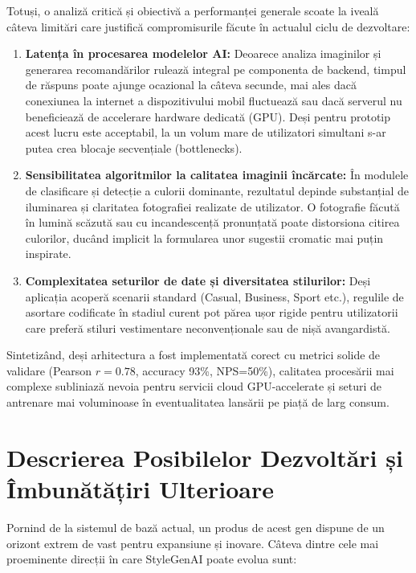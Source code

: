 Totuși, o analiză critică și obiectivă a performanței generale scoate la iveală câteva limitări care justifică compromisurile făcute în actualul ciclu de dezvoltare:

\begin{enumerate}
    \item \textbf{Latența în procesarea modelelor AI:} Deoarece analiza imaginilor și generarea recomandărilor rulează integral pe componenta de backend, timpul de răspuns poate ajunge ocazional la câteva secunde, mai ales dacă conexiunea la internet a dispozitivului mobil fluctuează sau dacă serverul nu beneficiează de accelerare hardware dedicată (GPU). Deși pentru prototip acest lucru este acceptabil, la un volum mare de utilizatori simultani s-ar putea crea blocaje secvențiale (bottlenecks).
    \item \textbf{Sensibilitatea algoritmilor la calitatea imaginii încărcate:} În modulele de clasificare și detecție a culorii dominante, rezultatul depinde substanțial de iluminarea și claritatea fotografiei realizate de utilizator. O fotografie făcută în lumină scăzută sau cu incandescență pronunțată poate distorsiona citirea culorilor, ducând implicit la formularea unor sugestii cromatic mai puțin inspirate.
    \item \textbf{Complexitatea seturilor de date și diversitatea stilurilor:} Deși aplicația acoperă scenarii standard (Casual, Business, Sport etc.), regulile de asortare codificate în stadiul curent pot părea ușor rigide pentru utilizatorii care preferă stiluri vestimentare neconvenționale sau de nișă avangardistă.
\end{enumerate}

Sintetizând, deși arhitectura a fost implementată corect cu metrici solide de validare (Pearson $r=0.78$, accuracy 93\%, NPS=50\%), calitatea procesării mai complexe subliniază nevoia pentru servicii cloud GPU-accelerate și seturi de antrenare mai voluminoase în eventualitatea lansării pe piață de larg consum.

\section{Descrierea Posibilelor Dezvoltări și Îmbunătățiri Ulterioare}

Pornind de la sistemul de bază actual, un produs de acest gen dispune de un orizont extrem de vast pentru expansiune și inovare. Câteva dintre cele mai proeminente direcții în care StyleGenAI poate evolua sunt:

